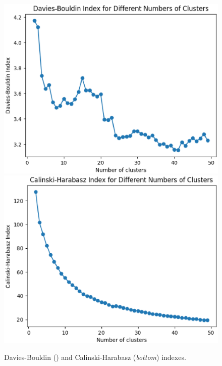 \documentclass[a4paper, review, endfloat, doubleblind, authoryear]{elsarticle}
\begin{document}
	\begin{figure}[htbp]
		\centering
		\includegraphics[height=0.2\textheight, keepaspectratio]{pics/davis_bouldin.eps}
		\includegraphics[height=0.2\textheight, keepaspectratio]{pics/calinski.eps}
		\caption{Davies-Bouldin () and Calinski-Harabasz (\textit{bottom}) indexes.}\label{fig:fig10}
	\end{figure}
		
\end{document}
